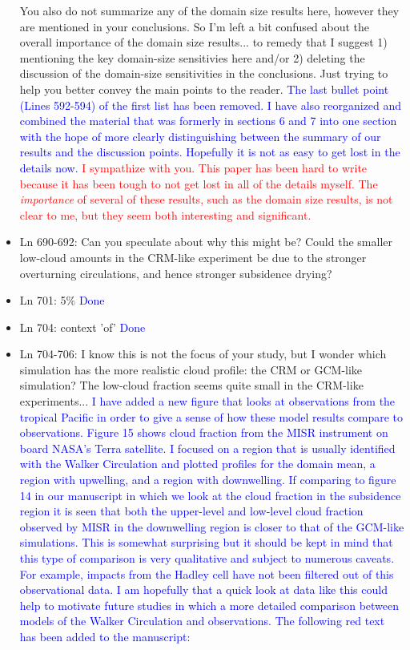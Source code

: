 \documentclass[draft]{agujournal2019}
\begin{document}
\begin{itemize}
You also do not summarize any of the domain size results here, however they are mentioned in your conclusions. So I'm left a bit confused about the overall importance of the domain size results... to remedy that I suggest 1) mentioning the key domain-size sensitivies here and/or 2)  deleting the discussion of the domain-size sensitivities in the conclusions. Just trying to help you better convey the main points to the reader.
  \textcolor{blue}{The last bullet point (Lines 592-594) of the first list has been removed.  I have also reorganized and combined the material that was 
  formerly in sections 6 and 7 into one section with the hope of more clearly distinguishing between the summary of our results and the discussion points.  Hopefully it is not as easy to get lost in the details now.}
  \textcolor{red}{I sympathize with you.  This paper has been hard to write because it has been tough to not get lost in all of the details myself.  The \textit{importance} of several of these results, such as the domain size results, is not clear to me, but they 
  seem both interesting and significant.}
  
  \item Ln 690-692: Can you speculate about why this might be? Could the smaller low-cloud amounts in the CRM-like experiment be due to the stronger overturning circulations, and hence stronger subsidence drying? 
  
  \item Ln 701: 5\%
  \textcolor{blue}{Done}
  
  \item Ln 704: context 'of' 
  \textcolor{blue}{Done}
  
  \item Ln 704-706: I know this is not the focus of your study, but I wonder which simulation has the more realistic cloud profile: the CRM or GCM-like simulation? The low-cloud fraction seems quite small in the CRM-like experiments...
  \textcolor{blue}{I have added a new figure that looks at observations from the tropical Pacific in order to give a sense of how these model results compare to observations.  
  Figure 15 shows cloud fraction from the MISR instrument on board NASA's Terra satellite.  I focused on a region that is usually identified with the Walker Circulation and plotted profiles for the domain mean, a region with upwelling, and a region with downwelling.  If comparing to figure 14 in our manuscript in which we look at the cloud fraction in the subsidence 
  region it is seen that both the upper-level and low-level cloud fraction observed by MISR in the downwelling region is closer to that of the GCM-like simulations.  This is 
  somewhat surprising but it should be kept in mind that this type of comparison is very qualitative and subject to numerous caveats.  For example, impacts from the Hadley cell 
  have not been filtered out of this observational data.  I am hopefully that a quick look at data like this could help to motivate future studies in which a more detailed comparison 
  between models of the Walker Circulation and observations.  The following red text has been added to the manuscript:}
  

\end{itemize}
\end{document}
